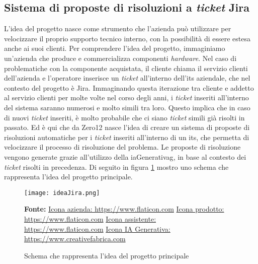 \subsection{Sistema di proposte di risoluzioni a \textit{ticket} Jira} \label{sec:spiegazioneJira}
L'idea del progetto nasce come strumento che l'azienda può utilizzare per velocizzare il proprio supporto tecnico interno, con la possibilità di essere estesa anche ai suoi clienti. Per comprendere l'idea del progetto, immaginiamo un'azienda che produce e commercializza componenti \textit{hardware}. 
Nel caso di problematiche con la componente acquistata, il cliente chiama il servizio clienti dell'azienda e l'operatore inserisce un \textit{ticket} all'interno dell'\gls{its} aziendale, che nel contesto del progetto è Jira. Immaginando questa iterazione tra cliente e addetto al servizio clienti per molte volte nel corso degli anni, i \textit{ticket} inseriti all'interno del sistema saranno numerosi e molto simili tra loro. 
Questo implica che in caso di nuovi \textit{ticket} inseriti, è molto probabile che ci siano \textit{ticket} simili già risolti in passato. 
Ed è qui che da Zero12 nasce l'idea di creare un sistema di proposte di risoluzioni automatiche per i \textit{ticket} inseriti all'interno di un \gls{its}, che permetta di velocizzare il processo di risoluzione del problema. Le proposte di risoluzione vengono generate grazie all'utilizzo della \gls{iaGenerativag}, in base al contesto dei \textit{ticket} risolti in precedenza.
Di seguito in figura \ref{fig:ideaJira} mostro uno schema che rappresenta l'idea del progetto principale.

\begin{figure}[H]
    \centering
    \texttt{[image: ideaJira.png]}
    \caption{Schema che rappresenta l'idea del progetto principale}
    \small \textbf{Fonte:} \href{https://www.flaticon.com/free-icon/company_4812244}{Icona azienda: https://www.flaticon.com} \href{https://www.flaticon.com/free-icon/box_4601560}{Icona prodotto: https://www.flaticon.com} \href{https://www.flaticon.com/free-icon/assistant_1442194}{Icona assistente: https://www.flaticon.com} \href{https://www.creativefabrica.com/it/product/ai-brain-outline-icon/} {Icona IA Generativa: https://www.creativefabrica.com}

    \label{fig:ideaJira}
\end{figure}
